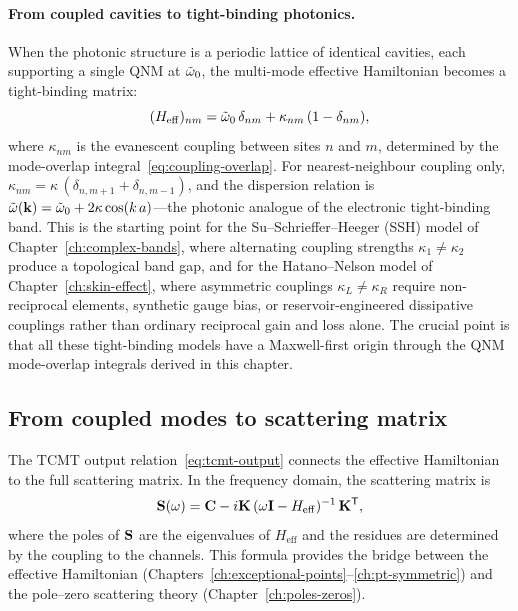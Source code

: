 \paragraph{From coupled cavities to tight-binding photonics.}
When the photonic structure is a periodic lattice of identical cavities,
each supporting a single QNM at $\tilde{\omega}_0$, the multi-mode effective
Hamiltonian becomes a tight-binding matrix:
\begin{equation}
 (H_{\mathrm{eff}})_{nm} = \tilde{\omega}_0\,\delta_{nm}
 + \kappa_{nm}\,(1 - \delta_{nm}),
 \label{eq:tight-binding-photonic}
\end{equation}
where $\kappa_{nm}$ is the evanescent coupling between sites $n$ and $m$,
determined by the mode-overlap integral~\eqref{eq:coupling-overlap}. For
nearest-neighbour coupling only, $\kappa_{nm} = \kappa\,(\delta_{n,m+1} +
\delta_{n,m-1})$, and the dispersion relation is
$\tilde{\omega}(\mathbf{k}) = \tilde{\omega}_0 + 2\kappa\cos(k\,a)$---the photonic analogue of
the electronic tight-binding band. This is the starting point for the
Su--Schrieffer--Heeger (SSH) model of Chapter~\ref{ch:complex-bands},
where alternating coupling strengths $\kappa_1 \neq \kappa_2$ produce a
topological band gap, and for the Hatano--Nelson model of
Chapter~\ref{ch:skin-effect}, where asymmetric couplings
$\kappa_L \neq \kappa_R$ require non-reciprocal elements, synthetic
gauge bias, or reservoir-engineered dissipative couplings rather than
ordinary reciprocal gain and loss alone. The crucial point is that all
these tight-binding models have a Maxwell-first origin through the QNM
mode-overlap integrals derived in this chapter.

\subsection{From coupled modes to scattering matrix}
\label{ssec:cmt-to-smatrix}

The TCMT output relation~\eqref{eq:tcmt-output} connects the effective
Hamiltonian to the full scattering matrix. In the frequency domain,
the scattering matrix is
\begin{equation}
 \mathbf{S}(\omega) = \mathbf{C} - i\mathbf{K}\,
 (\omega\mathbf{I} - H_{\mathrm{eff}})^{-1}\,\mathbf{K}^{\mathsf{T}},
 \label{eq:smat-from-heff}
\end{equation}
where the poles of $\mathbf{S}$ are the eigenvalues of $H_{\mathrm{eff}}$
and the residues are determined by the coupling to the channels. This
formula provides the bridge between the effective Hamiltonian
(Chapters~\ref{ch:exceptional-points}--\ref{ch:pt-symmetric}) and the
pole--zero scattering theory (Chapter~\ref{ch:poles-zeros}).

